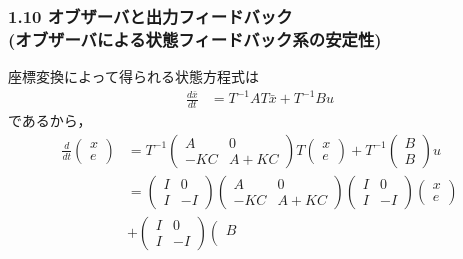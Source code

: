 \documentclass[10pt]{beamer}
\begin{document}
\begin{frame}[t]
\frametitle{1.10 オブザーバと出力フィードバック \\
(オブザーバによる状態フィードバック系の安定性)}
座標変換によって得られる状態方程式は
\begin{align}
 \frac{d \bar{x}}{dt} &= T^{-1} A T \bar{x} + T^{-1} B u 
\end{align}
であるから，
{\footnotesize
\begin{align}
 \frac{d}{dt}
  \left(\begin{array}{c}
         x \\
   e
  \end{array}\right)
  &=
  T^{-1}
  \left(\begin{array}{cc}
         A & 0 \\
   -KC & A+KC
  \end{array}\right)
  T
  \left(\begin{array}{c}
         x \\
   e
  \end{array}\right)
  +
  T^{-1}
  \left(\begin{array}{c}
         B \\
   B
  \end{array}\right)
  u
\nonumber \\
  &=
 \left(\begin{array}{cc}
        I & 0 \\
  I & -I
       \end{array}\right)
  \left(\begin{array}{cc}
         A & 0 \\
   -KC & A+KC
  \end{array}\right)
 \left(\begin{array}{cc}
        I & 0 \\
  I & -I
       \end{array}\right)
  \left(\begin{array}{c}
         x \\
   e
  \end{array}\right)
  \nonumber \\ & 
  +
 \left(\begin{array}{cc}
        I & 0 \\
  I & -I
       \end{array}\right)
  \left(\begin{array}{c}
         B \\

\end{array}
\end{align}}
\end{frame}
\end{document}
